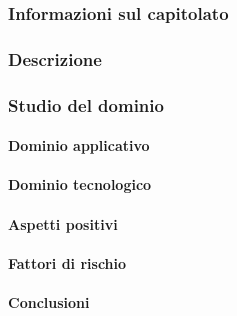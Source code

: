	\subsubsection{Informazioni sul capitolato}
	\subsubsection{Descrizione}
	\subsubsection{Studio del dominio}
	\paragraph{Dominio applicativo}
	\paragraph{Dominio tecnologico}
	\paragraph{Aspetti positivi}
	\paragraph{Fattori di rischio}
	\paragraph{Conclusioni}
	
	
	